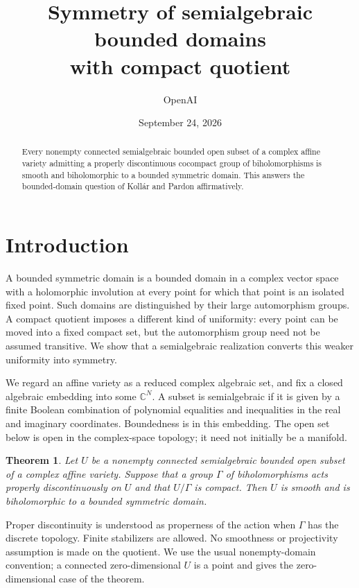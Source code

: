 \documentclass[11pt]{article}
\title{Symmetry of semialgebraic bounded domains\\with compact quotient}
\author{OpenAI}
\date{September 24, 2026}
\numberwithin{equation}{section}
\newtheorem{theorem}{Theorem}[section]
\theoremstyle{definition}
\theoremstyle{remark}
\newcommand{\C}{\mathbb C}
\begin{document}
\maketitle
\begin{abstract}
Every nonempty connected semialgebraic bounded open subset of a complex
affine variety admitting a properly discontinuous cocompact group of
biholomorphisms is smooth and biholomorphic to a bounded symmetric domain.
This answers the bounded-domain question of Koll\'ar and Pardon affirmatively.
\end{abstract}

\section{Introduction}
\label{sec:introduction}

A bounded symmetric domain is a bounded domain in a complex vector space
with a holomorphic involution at every point for which that point is an
isolated fixed point. Such domains are distinguished by their large
automorphism groups. A compact quotient imposes a different kind of
uniformity: every point can be moved into a fixed compact set, but the
automorphism group need not be assumed transitive. We show that a
semialgebraic realization converts this weaker uniformity into symmetry.

We regard an affine variety as a reduced complex algebraic set, and fix a
closed algebraic embedding into some \(\C^N\). A subset is semialgebraic
if it is given by a finite Boolean combination of polynomial equalities
and inequalities in the real and imaginary coordinates. Boundedness is
in this embedding. The open set below is open in the complex-space
topology; it need not initially be a manifold.

\begin{theorem}\label{thm:main}
Let \(U\) be a nonempty connected semialgebraic bounded open subset of a
complex affine variety. Suppose that a group \(\Gamma\) of
biholomorphisms acts properly discontinuously on \(U\) and that
\(U/\Gamma\) is compact. Then \(U\) is smooth and is biholomorphic to a
bounded symmetric domain.
\end{theorem}

Proper discontinuity is understood as properness of the action when
\(\Gamma\) has the discrete topology. Finite stabilizers are allowed.
No smoothness or projectivity assumption is made on the quotient. We use
the usual nonempty-domain convention; a connected zero-dimensional
\(U\) is a point and gives the zero-dimensional case of the theorem.
\end{document}
